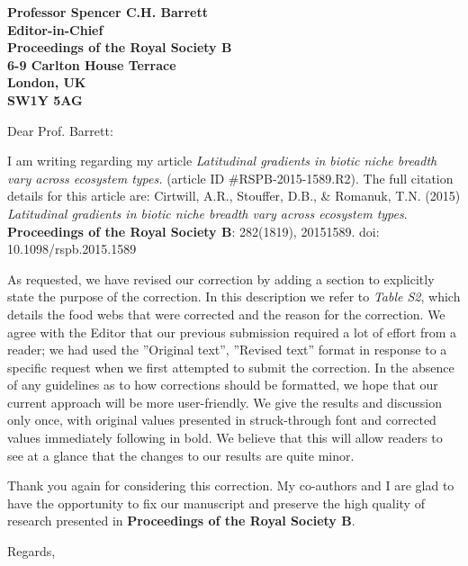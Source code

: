 \documentclass[12pt]{letter}
\begin{document}
\begin{letter}{\bf Professor Spencer C.H. Barrett\\
               Editor-in-Chief\\
               Proceedings of the Royal Society B\\
               6-9 Carlton House Terrace\\
               London, UK\\
               SW1Y 5AG\\
                }

\opening{Dear Prof. Barrett:}

I am writing regarding my article \emph{Latitudinal gradients in biotic niche breadth vary across ecosystem types.} (article ID \#RSPB-2015-1589.R2). The full citation details for this article are: Cirtwill, A.R., Stouffer, D.B., \& Romanuk, T.N. (2015) \emph{Latitudinal gradients in biotic niche breadth vary across ecosystem types}. \textbf{Proceedings of the Royal Society B}: 282(1819), 20151589. doi: 10.1098/rspb.2015.1589 


As requested, we have revised our correction by adding a section to explicitly state the purpose of the correction. In this description we refer to \emph{Table S2}, which details the food webs that were corrected and the reason for the correction. We agree with the Editor that our previous submission required a lot of effort from a reader; we had used the ''Original text'', ''Revised text'' format in response to a specific request when we first attempted to submit the correction. In the absence of any guidelines as to how corrections should be formatted, we hope that our current approach will be more user-friendly. We give the results and discussion only once, with original values presented in struck-through font and corrected values immediately following in bold. We believe that this will allow readers to see at a glance that the changes to our results are quite minor.


Thank you again for considering this correction. My co-authors and I are glad to have the opportunity to fix our manuscript and preserve the high quality of research presented in \textbf{Proceedings of the Royal Society B}.


\closing{Regards,}


\end{letter}


\end{document}
